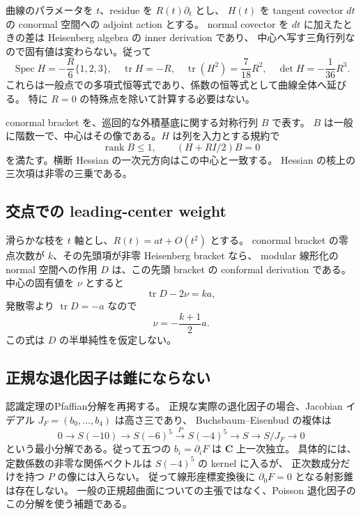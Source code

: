 \documentclass[11pt,a4paper]{ltjsarticle}
\newcommand{\CC}{\mathbf C}\newcommand{\QQ}{\mathbf Q}
\DeclareMathOperator{\rank}{rank}\DeclareMathOperator{\tr}{tr}
\theoremstyle{remark}\newtheorem{remark}[theorem]{注意}
\begin{document}
曲線のパラメータを $t$、residue を $R(t)\partial_t$ とし、
$H(t)$ を tangent covector $dt$ の conormal 空間への adjoint action とする。
normal covector を $dt$ に加えたときの差は Heisenberg algebra の inner derivation であり、
中心へ写す三角行列なので固有値は変わらない。従って
\begin{equation}\label{eq:e8-spectrum}
 \operatorname{Spec}H=-\frac R6\{1,2,3\},\quad
 \tr H=-R,\quad \tr(H^2)=\frac7{18}R^2,\quad \det H=-\frac1{36}R^3.
\end{equation}
これらは一般点での多項式恒等式であり、係数の恒等式として曲線全体へ延びる。
特に $R=0$ の特殊点を除いて計算する必要はない。

conormal bracket を、巡回的な外積基底に関する対称行列 $B$ で表す。
$B$ は一般に階数一で、中心はその像である。$H$ は列を入力とする規約で
\begin{equation}\label{eq:e8-center}
 \rank B\le1,\qquad (H+RI/2)B=0
\end{equation}
を満たす。横断 Hessian の一次元方向はこの中心と一致する。
Hessian の核上の三次項は非零の三乗である。

\subsection{交点での leading-center weight}
滑らかな枝を $t$ 軸とし、$R(t)=a t+O(t^2)$ とする。
conormal bracket の零点次数が $k$、その先頭項が非零 Heisenberg bracket なら、
modular 線形化の normal 空間への作用 $D$ は、この先頭 bracket の conformal derivation である。
中心の固有値を $\nu$ とすると
\[
 \tr D-2\nu=ka,
\]
発散零より $\tr D=-a$ なので
\begin{equation}\label{eq:leading-center}
 \boxed{\nu=-\frac{k+1}{2}a.}
\end{equation}
この式は $D$ の半単純性を仮定しない。

\subsection{正規な退化因子は錐にならない}
認識定理のPfaffian分解を再掲する。
正規な実際の退化因子の場合、Jacobian イデアル $J_F=(b_0,\ldots,b_4)$ は高さ三であり、
Buchsbaum--Eisenbud の複体\cite{BE}は
\[
 0\longrightarrow S(-10)\longrightarrow S(-6)^5
 \xrightarrow{P}S(-4)^5\longrightarrow S\longrightarrow S/J_F\longrightarrow0
\]
という最小分解である。従って五つの $b_i=\partial_iF$ は $\CC$ 上一次独立。
具体的には、定数係数の非零な関係ベクトルは $S(-4)^5$ の kernel に入るが、
正次数成分だけを持つ $P$ の像には入らない。
従って線形座標変換後に $\partial_0F=0$ となる射影錐は存在しない。
一般の正規超曲面についての主張ではなく、Poisson 退化因子のこの分解を使う補題である。
\end{document}
